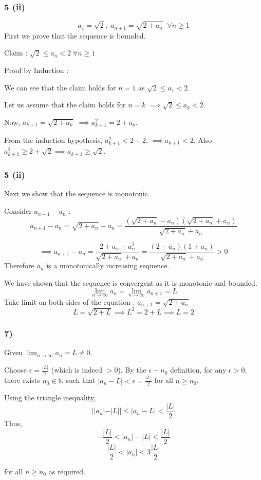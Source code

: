 \documentclass{beamer}
\begin{document}
\begin{frame}
  \frametitle{5 (ii)}
  \[a_{1} = \sqrt{2}, \; a_{n+1} = \sqrt{2+a_{n}}  \; \; \forall n \ge 1\] \pause
  First we prove that the sequence is bounded. \pause

  Claim : $\sqrt{2} \le a_{n} < 2 \; \forall n \ge 1$ \pause 

  Proof by Induction : 

  We can see that the claim holds for $n = 1$ as $\sqrt{2} \le a_{1} < 2$. \pause

  Let us assume that the claim holds for $ n = k$ $ \implies \sqrt{2} \le  a_{k} < 2$.\pause

  Now, $a_{k+1} = \sqrt{2+a_{k}}$ $ \implies a_{k+1}^{2} = 2 + a_{k}$.\pause

  From the induction hypothesis, $a_{k+1}^{2} < 2 + 2$. $ \implies a_{k+1} < 2$. Also \pause
  $a_{k+1}^{2} \ge 2 + \sqrt{2} \implies a_{k+1} \ge \sqrt{2}$.

\end{frame}

\begin{frame}
  \frametitle{5 (ii)}
  Next we show that the sequence is monotonic.\pause

  Consider $a_{n+1} - a_{n}$ : 
  \[a_{n+1} - a_{n} = \sqrt{2+a_{n}} - a_{n} = \frac{(\sqrt{2+a_{n}} - a_{n})(\sqrt{2+a_{n}} + a_{n})}{\sqrt{2+a_{n}} + a_{n}} \] \pause

  \[ \implies a_{n+1} - a_{n} = \frac{2+a_{n} - a_{n}^{2}}{\sqrt{2+a_{n}} + a_{n}} = \frac{(2-a_{n})(1+a_{n})}{\sqrt{2+a_{n}} + a_{n}}  > 0 \] 
  Therefore $a_{n}$ is a monotonically increasing sequence.\pause

  We have shown that the sequence is convergent as it is monotonic and bounded.
  \[\lim_{n \rightarrow \infty} a_{n} = \lim_{n \rightarrow \infty} a_{n+1} = L\]
  Take limit on both sides of the equation : \( a_{n+1} = \sqrt{2+a_{n}} \)
  \[ L = \sqrt{2+L} \implies L^{2} = 2 + L \implies L = 2\]
\end{frame}

\begin{frame}
    \frametitle{7)}
    Given \(\lim_{n \rightarrow \infty} a_{n} = L \neq 0 \). \pause
    
    Choose $\epsilon = \frac{|L|}{2}$ (which is indeed $> 0$). \pause
    By the $\epsilon - n_{0}$ definition, for any $\epsilon > 0$, there exists $n_{0} \in \mathbb{N}$ such that 
    $| a_{n} - L| < \epsilon = \frac{|L|}{2}$ for all $n \ge n_{0}$. \pause 

    Using the triangle inequality, 
    \[||a_{n}|-|L|| \le |a_{n}-L| < \frac{|L|}{2}  \]\pause
    Thus,
    \[-\frac{|L|}{2} < |a_{n}|-|L| < \frac{|L|}{2}  \] \pause
    \[ \frac{|L|}{2} < |a_{n}| < 3\frac{|L|}{2}\] 
    
    for all $n \ge n_{0}$ as required.

\end{frame}
\end{document}
